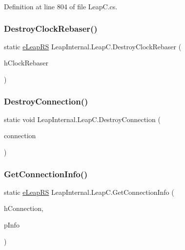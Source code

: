 Definition at line 804 of file Leap\+C.\+cs.

\mbox{\label{class_leap_internal_1_1_leap_c_a72516d54ac9cccc3c7bd8bb064109273}} 
\subsubsection{\texorpdfstring{DestroyClockRebaser()}{DestroyClockRebaser()}}
{\footnotesize\ttfamily static \mbox{\hyperlink{namespace_leap_internal_ae50b07d24c508b84273392b6dcbea1d9}{e\+Leap\+RS}} Leap\+Internal.\+Leap\+C.\+Destroy\+Clock\+Rebaser (\begin{DoxyParamCaption}\item[{Int\+Ptr}]{h\+Clock\+Rebaser }\end{DoxyParamCaption})}

\mbox{\label{class_leap_internal_1_1_leap_c_aa8924a99915ab03a814c211b9a9536c3}} 
\subsubsection{\texorpdfstring{DestroyConnection()}{DestroyConnection()}}
{\footnotesize\ttfamily static void Leap\+Internal.\+Leap\+C.\+Destroy\+Connection (\begin{DoxyParamCaption}\item[{Int\+Ptr}]{connection }\end{DoxyParamCaption})}

\mbox{\label{class_leap_internal_1_1_leap_c_abaf56f46dac48027a36aa0c08d94abbf}} 
\subsubsection{\texorpdfstring{GetConnectionInfo()}{GetConnectionInfo()}}
{\footnotesize\ttfamily static \mbox{\hyperlink{namespace_leap_internal_ae50b07d24c508b84273392b6dcbea1d9}{e\+Leap\+RS}} Leap\+Internal.\+Leap\+C.\+Get\+Connection\+Info (\begin{DoxyParamCaption}\item[{Int\+Ptr}]{h\+Connection,  }\item[{ref \mbox{\hyperlink{struct_leap_internal_1_1_l_e_a_p___c_o_n_n_e_c_t_i_o_n___i_n_f_o}{L\+E\+A\+P\+\_\+\+C\+O\+N\+N\+E\+C\+T\+I\+O\+N\+\_\+\+I\+N\+FO}}}]{p\+Info }\end{DoxyParamCaption})}

